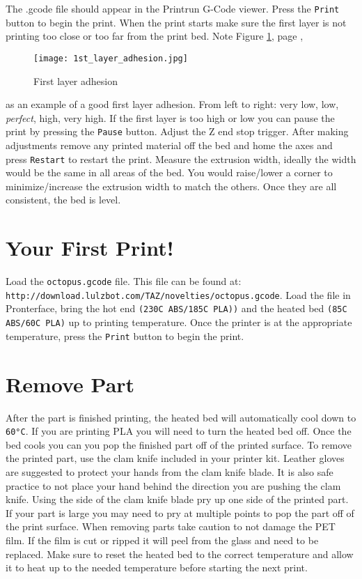 The .gcode file should appear in the Printrun G-Code viewer. Press the \texttt{Print} button to begin the print. When the print starts make sure the first layer is not printing too close or too far from the print bed. Note 
Figure \ref{fig:1st_layer_adhesion}, page \pageref{fig:1st_layer_adhesion},
\begin{figure}[hbt]
\centering
\texttt{[image: 1st\_layer\_adhesion.jpg]}
\caption{First layer adhesion}
\label{fig:1st_layer_adhesion}
\end{figure}
as an example of a good first layer adhesion. From left to right: very low, low, \emph{perfect}, high, very high. If the first layer is too high or low you can pause the print by pressing the \texttt{Pause} button. Adjust the Z end stop trigger. After making adjustments remove any printed material off the bed and home the axes and press \texttt{Restart} to restart the print. Measure the extrusion width, ideally the width would be the same in all areas of the bed. You would raise/lower a corner to minimize/increase the extrusion width to match the others. Once they are all consistent, the bed is level.

\section{Your First Print!}
Load the \texttt{octopus.gcode} file.
This file can be found at:
\texttt{http://download.lulzbot.com/TAZ/novelties/octopus.gcode}. Load the file in Pronterface, bring the hot end \texttt{(230C ABS/185C PLA))} and the heated bed \texttt{(85C ABS/60C PLA)} up to printing temperature. Once the printer is at the appropriate temperature, press the \texttt{Print} button to begin the print.

\section{Remove Part}
After the part is finished printing, the heated bed will automatically cool down to \texttt{60°C}. If you are printing PLA you will need to turn the heated bed off. Once the bed cools you can you pop the finished part off of the printed surface. To remove the printed part, use the clam knife included in your printer kit. Leather gloves are suggested to protect your hands from the clam knife blade. It is also safe practice to not place your hand behind the direction you are pushing the clam knife. Using the side of the clam knife blade pry up one side of the printed part. If your part is large you may need to pry at multiple points to pop the part off of the print surface. When removing parts take caution to not damage the PET film. If the film is cut or ripped it will peel from the glass and need to be replaced. Make sure to reset the heated bed to the correct temperature and allow it to heat up to the needed temperature before starting the next print.

